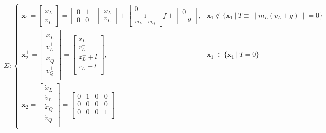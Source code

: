 \documentclass[11pt]{article}
\begin{document}
\[
 \Sigma :
\begin{cases}
\dot{\mathbf{x}}_1 = 
\begin{bmatrix}
       \dot{x}_L \\ \dot{v}_L
\end{bmatrix}
= 
\begin{bmatrix}
       0 & 1 \\
       0 & 0 
\end{bmatrix}
\begin{bmatrix} 
	x_L \\ v_L 
\end{bmatrix}
+ 
\begin{bmatrix}
	0 \\ 
       \frac{1}{m_L+m_Q}
\end{bmatrix}
f 
+
\begin{bmatrix}
	0 \\ 
       -g
\end{bmatrix},
& 
\mathbf{x}_1 \not\in \{ \mathbf{x}_1 \ | \  T \equiv \| m_L(\dot{v}_L + g) \| = 0 \} \\
\mathbf{x}_2^+ = 
\begin{bmatrix}
      {x}_L^+ \\ {v}_L^+ \\ {x}_Q^+ \\ {v}_Q^+ \\
\end{bmatrix}
= 
\begin{bmatrix}
       {x}_L^- \\ {v}_L^- \\ {x}_L^- + l \\ {v}_L^- + l \\
\end{bmatrix} , 
&  
\mathbf{x}_1^- \in \{ \mathbf{x}_1 \ | \  T = 0 \} \\
\dot{\mathbf{x}}_2 = 
\begin{bmatrix}
       \dot{{x}}_L \\ \dot{{v}}_L \\ \dot{{x}}_Q \\ \dot{{v}}_Q \\
\end{bmatrix}
= 
\begin{bmatrix}
       0 & 1 & 0 & 0 \\
       0 & 0 & 0 & 0 \\
       0 & 0 & 0 & 1 \\

\end{bmatrix}
\end{cases}\]
\end{document}
